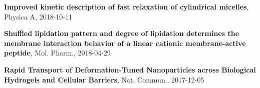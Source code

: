 
\begin{cventries}
  \vspace{-10pt}
  \cventry
    {} %
    {} %
    {} %
    {} %
    {
      \begin{cvitems} %
        \item {\textbf{Improved kinetic description of fast relaxation of cylindrical micelles}, Physica A, 2018-10-11}
        \item {\textbf{Shuffled lipidation pattern and degree of lipidation determines the membrane interaction behavior of a linear cationic membrane-active peptide}, Mol. Pharm., 2018-04-29}
        \item {\textbf{Rapid Transport of Deformation-Tuned Nanoparticles across Biological Hydrogels and Cellular Barriers}, Nat. Commun., 2017-12-05}
      \end{cvitems}
    }
    
\end{cventries}